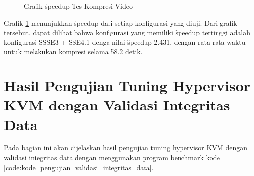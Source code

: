 \begin{figure}
    \centering
    \caption{Grafik \f{speedup} Tes Kompresi Video}
    \label{fig:video_compression_test_graph}
\end{figure}

Grafik \ref{fig:video_compression_test_graph} menunjukkan \f{speedup} dari setiap konfigurasi yang diuji. Dari grafik tersebut, dapat dilihat bahwa konfigurasi yang memiliki \f{speedup} tertinggi adalah konfigurasi SSSE3 + SSE4.1 denga nilai \f{speedup} 2.431, dengan rata-rata waktu untuk melakukan kompresi selama 58.2 detik.

\section{Hasil Pengujian Tuning Hypervisor KVM dengan Validasi Integritas Data}
Pada bagian ini akan dijelaskan hasil pengujian tuning hypervisor KVM dengan validasi integritas data dengan menggunakan program benchmark kode \ref{code:kode_pengujian_validasi_integritas_data}.

